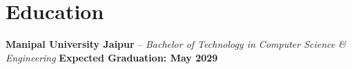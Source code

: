 \documentclass[a4paper,9pt]{extarticle}
\begin{document}
\section{Education}
\noindent\textbf{Manipal University Jaipur} -- \textit{Bachelor of Technology in Computer Science \& Engineering} \hfill \textbf{Expected Graduation: May 2029}
\end{document}
